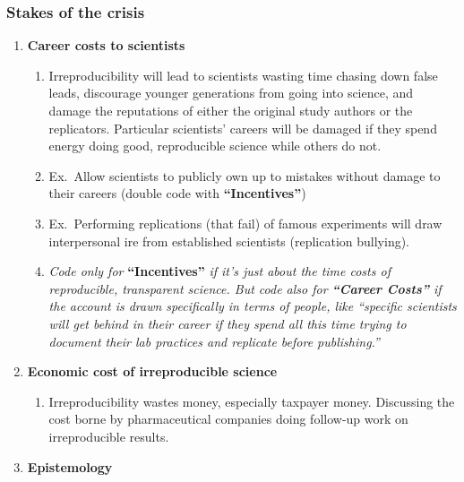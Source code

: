 \documentclass[
]{scrartcl}
\providecommand{\tightlist}{%
  \setlength{\itemsep}{0pt}\setlength{\parskip}{0pt}}
\begin{document}
\hypertarget{stakes-of-the-crisis}{%
\subsubsection{Stakes of the crisis}\label{stakes-of-the-crisis}}

\begin{enumerate}
\def\labelenumi{\arabic{enumi}.}
\item
  \textbf{Career costs to scientists}

  \begin{enumerate}

  \item
    Irreproducibility will lead to scientists wasting time chasing down
    false leads, discourage younger generations from going into science,
    and damage the reputations of either the original study authors or
    the replicators. Particular scientists' careers will be damaged if
    they spend energy doing good, reproducible science while others do
    not.
  \item
    Ex.~Allow scientists to publicly own up to mistakes without damage
    to their careers (double code with \textbf{``Incentives''})
  \item
    Ex.~Performing replications (that fail) of famous experiments will
    draw interpersonal ire from established scientists (replication
    bullying).
  \item
    \emph{Code only for} \textbf{``Incentives''} \emph{if it's just
    about the time costs of reproducible, transparent science. But code
    also for \textbf{``Career Costs''} if the account is drawn
    specifically in terms of people, like ``specific scientists will get
    behind in their career if they spend all this time trying to
    document their lab practices and replicate before publishing.''}
  \end{enumerate}
\item
  \textbf{Economic cost of irreproducible science}

  \begin{enumerate}

  \tightlist
  \item
    Irreproducibility wastes money, especially taxpayer money.
    Discussing the cost borne by pharmaceutical companies doing
    follow-up work on irreproducible results.
  \end{enumerate}
\item
  \textbf{Epistemology}

  \begin{enumerate}


\end{enumerate}
\end{enumerate}
\end{document}
